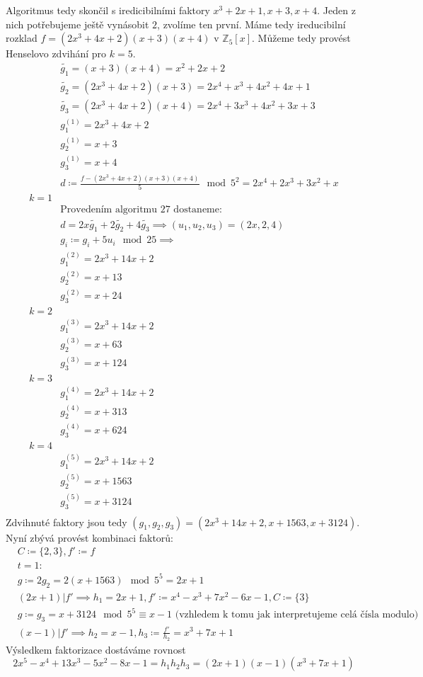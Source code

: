 \documentclass[12pt, a4paper]{article}
\begin{document}
Algoritmus tedy skončil s iredicibilními faktory $x^3+2x+1, x+3, x+4$. Jeden z nich potřebujeme ještě vynásobit $2$, zvolíme ten první. Máme tedy ireducibilní rozklad $f=(2x^3+4x+2)(x+3)(x+4)$ v $\mathbb{Z}_5[x]$. Můžeme tedy provést Henselovo zdvihání pro $k=5$.
\begin{align*}
&\tilde{g_1} = (x+3)(x+4)=x^2+2x+2\\
&\tilde{g_2} = (2x^3+4x+2)(x+3)=2x^4+x^3+4x^2+4x+1\\
&\tilde{g_3} = (2x^3+4x+2)(x+4)=2x^4+3x^3+4x^2+3x+3\\
&g_1^{(1)} = 2x^3+4x+2\\
&g_2^{(1)}  = x+3\\
&g_3^{(1)}  = x+4\\
&d \coloneqq \frac{f-(2x^3+4x+2)(x+3)(x+4)}{5} \mod 5^2 = 2x^4+2x^3+3x^2+x\\
k=1\\
&\text{Provedením algoritmu 27 dostaneme:}\\
&d=2x\tilde{g_1}+2\tilde{g_2}+4\tilde{g_3} \implies (u_1,u_2,u_3) = (2x,2,4)\\
&g_i \coloneqq g_i+5u_i \mod 25 \implies\\
&g_1^{(2)}  = 2x^3+14x+2\\
&g_2^{(2)}  = x+13\\
&g_3^{(2)}  = x+24\\
k=2\\
&g_1^{(3)}  = 2x^3+14x+2\\
&g_2^{(3)}  = x+63\\
&g_3^{(3)}  = x+124\\
k=3\\
&g_1^{(4)}  = 2x^3+14x+2\\
&g_2^{(4)}  = x+313\\
&g_3^{(4)}  = x+624\\
k=4\\
&g_1^{(5)}  = 2x^3+14x+2\\
&g_2^{(5)}  = x+1563\\
&g_3^{(5)}  = x+3124\\
\end{align*}
Zdvihnuté faktory jsou tedy $(g_1,g_2,g_3)=(2x^3+14x+2, x+1563, x+3124)$. Nyní zbývá provést kombinaci faktorů:
\begin{align*}
&C\coloneqq \{2,3\}, f' \coloneqq f\\
&t=1:\\
&g\coloneqq 2 g_2 = 2(x+1563) \mod 5^5 = 2x+1\\
&(2x+1)|f' \implies h_1 = 2x+1, f' \coloneqq x^4-x^3+7x^2-6x-1, C \coloneqq \{3\}\\
&g \coloneqq g_3 = x+3124 \mod 5^5 \equiv x-1 \text{ (vzhledem k tomu jak interpretujeme celá čísla modulo)}\\
&(x-1)|f' \implies h_2 = x-1, h_3 \coloneqq \frac{f'}{h_2} = x^3+7x+1
\end{align*}
Výsledkem faktorizace dostáváme rovnost
\[
 2 x^5 - x^4 + 13 x^3 - 5 x^2 - 8 x - 1 = h_1h_2h_3 = (2x+1)(x-1)(x^3+7x+1)
\]
\end{document}
